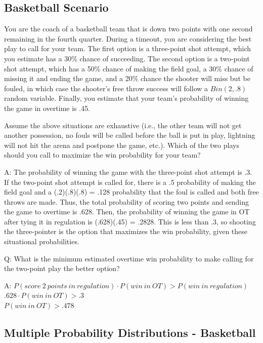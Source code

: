 \documentclass[
  11pt,
]{book}
\theoremstyle{definition}
\theoremstyle{definition}
\theoremstyle{definition}
\theoremstyle{definition}
\theoremstyle{remark}
\begin{document}
\hypertarget{basketball-scenario}{%
\subsection{Basketball Scenario}\label{basketball-scenario}}

You are the coach of a basketball team that is down two points with one second remaining in the fourth quarter. During a timeout, you are considering the best play to call for your team. The first option is a three-point shot attempt, which you estimate has a 30\% chance of succeeding. The second option is a two-point shot attempt, which has a 50\% chance of making the field goal, a 30\% chance of missing it and ending the game, and a 20\% chance the shooter will miss but be fouled, in which case the shooter's free throw success will follow a \(Bin(2, .8)\) random variable. Finally, you estimate that your team's probability of winning the game in overtime is .45.

Assume the above situations are exhaustive (i.e., the other team will not get another possession, no fouls will be called before the ball is put in play, lightning will not hit the arena and postpone the game, etc.). Which of the two plays should you call to maximize the win probability for your team?

A: The probability of winning the game with the three-point shot attempt is .3. If the two-point shot attempt is called for, there is a .5 probability of making the field goal and a (.2)(.8)(.8) = .128 probability that the foul is called and both free throws are made. Thus, the total probability of scoring two points and sending the game to overtime is .628. Then, the probability of winning the game in OT after tying it in regulation is (.628)(.45) = .2828. This is less than .3, so shooting the three-pointer is the option that maximizes the win probability, given these situational probabilities.

Q: What is the minimum estimated overtime win probability to make calling for the two-point play the better option?

A: \(P(score\ 2\ points\ in\ regulation) \cdot P(win\ in\ OT) > P(win\ in\ regulation)\)\\
\(.628 \cdot P(win\ in\ OT) > .3\)\\
\(P(win\ in\ OT) > .478\)

\hypertarget{multiple-probability-distributions---basketball}{%
\subsection{Multiple Probability Distributions - Basketball}\label{multiple-probability-distributions---basketball}}
\end{document}
